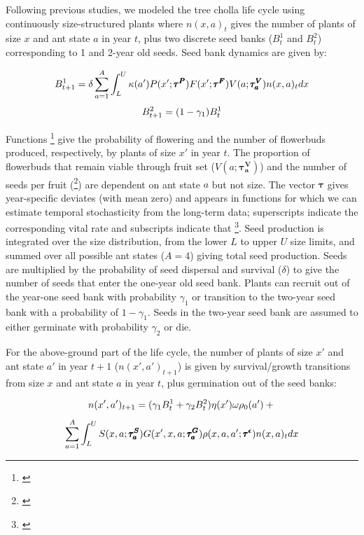 \documentclass[11pt]{article}
\newcommand{\tom}[2]{{\color{red}{#1}}\footnote{\textit{\color{red}{#2}}}}
\begin{document}
Following previous studies, we modeled the tree cholla life cycle using continuously size-structured plants where $n(x,a)_{t}$ gives the number of plants of size $x$ and ant state $a$ in year $t$, plus two discrete seed banks ($B^1_{t}$ and $B^2_{t}$) corresponding to 1 and 2-year old seeds. 
Seed bank dynamics are given by:

\begin{linenomath*}
	$$
	B^1_{t+1} = \delta \sum_{a=1}^{A} \int_L^U  \kappa(a') P(x';\pmb{\tau^P}) F(x';\pmb{\tau^F}) V(a;\pmb{\tau^V_{a}}) n(x,a)_{t} dx \\
	$$
	$$
	B^2_{t+1} =  (1 - \gamma_1)B^1_{t}\\
	$$
\end{linenomath*}

\noindent Functions \tom{$P(x';\pmb{\tau^P})$ and $F(x';\pmb{\tau^F})$}{These should be $x$ not $x'$ because we modeled flowering and fertility in year t based on size in year t.} give the probability of flowering and the number of flowerbuds produced, respectively, by plants of size $x'$ in year $t$. 
The proportion of flowerbuds that remain viable through fruit set ($V(a;\pmb{\tau^V_{a}})$) and the number of seeds per fruit (\tom{$\kappa(a')$}{Why is this $a'$? I think it should be $a$. More generally, I think you need to explain your use of primes and how readers should interpret them at the start of model exposition.}) are dependent on ant state $a$ but not size. 
The vector $\pmb{\tau}$ gives year-specific deviates (with mean zero) and appears in functions for which we can estimate temporal stochasticity from the long-term data; superscripts indicate the corresponding vital rate and subscripts indicate that \tom{deviates are specific to plants in ant state $a$}{Why does the tau vector for viability have the $a$ subscript but the others do not?}. 
Seed production is integrated over the size distribution, from the lower $L$ to upper $U$ size limits, and summed over all possible ant states ($A=4$) giving total seed production. 
Seeds are multiplied by the probability of seed dispersal and survival ($\delta$) to give the number of seeds that enter the one-year old seed bank. 
Plants can recruit out of the year-one seed bank with probability $\gamma_1$ or transition to the two-year seed bank with a probability of $1 - \gamma_1$. 
Seeds in the two-year seed bank are assumed to either germinate with probability $\gamma_2$ or die. 

For the above-ground part of the life cycle, the number of plants of size $x'$ and ant state $a'$ in year $t+1$ ($n(x',a')_{t+1}$) is given by survival/growth transitions from size $x$ and ant state $a$ in year $t$, plus germination out of the seed banks:
\begin{linenomath*}
	$$
	n(x',a')_{t+1} = (\gamma_1 B^1_{t} + \gamma_2 B^2_{t} ) \eta(x') \omega \rho_{0}(a')  + \\
	$$
	$$
	\sum_{a=1}^{A} \int_L^U S(x,a;\pmb{\tau^S_{a}}) G(x',x,a;\pmb{\tau^G_{a}}) \rho(x,a,a';\pmb{\tau^{\epsilon}}) n(x,a)_t dx \\
	$$
\end{linenomath*}
\end{document}
